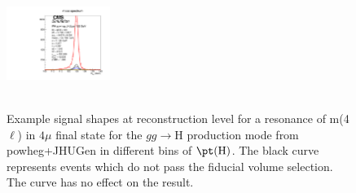 \begin{figure}[htb]
\begin{center}
{      \includegraphics[width=0.3\textwidth,angle=0]{Figures/Appendix//WH_powheg_JHUgen_125_4mu_pT4l_genbin4_recobin4_effs_genWeight*pileupWeight*dataMCWeight.pdf}
      \label{fig:sigfits-pT4l-WH-powheg15-JHUgen-125-maintext:e}
    }
     \\
    \\
    \caption{ Example signal shapes at reconstruction level for a resonance of m(4$\ell$) in $4\mu$ final state for the $gg\rightarrow \mathrm{H}$ production mode from {\sc powheg+JHUGen} in different bins of $\pt(\mathrm{H})$. The black curve represents events which do not pass the fiducial volume selection. The curve has no effect on the result.
    }
  \label{fig:sigfits-pT4l-WH-powheg15-JHUgen-125-maintext}
 \end{center}
\end{figure} \clearpage

